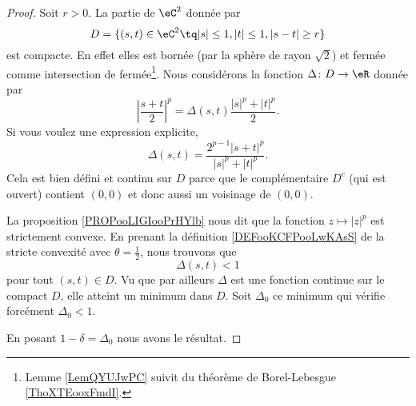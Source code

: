 \begin{proof}
Soit \( r>0\). La partie de \( \eC^2\) donnée par
\begin{equation}
    D=\{ (s,t)\in \eC^2\tq | s |\leq 1, | t |\leq 1,| s-t |\geq r \}
\end{equation}
est compacte. En effet elles est bornée (par la sphère de rayon \( \sqrt{ 2 }\)) et fermée comme intersection de fermée\footnote{Lemme \ref{LemQYUJwPC} suivit du théorème de Borel-Lebesgue \ref{ThoXTEooxFmdI}.}. Nous considérons la fonction \( \Delta\colon D\to \eR\) donnée par
\begin{equation}
    \left| \frac{ s+t }{2} \right|^p=\Delta(s,t)\frac{ | s |^p+| t |^p }{2}.
\end{equation}
Si vous voulez une expression explicite,
\begin{equation}
    \Delta(s,t)=\frac{ 2^{p-1}| s+t |^p }{ | s |^p+| t |^p }.
\end{equation}
Cela est bien défini et continu sur \( D\) parce que le complémentaire \( D^c\) (qui est ouvert) contient \( (0,0)\) et donc aussi un voisinage de \( (0,0)\).

La proposition \ref{PROPooLIGIooPrHYlb} nous dit que la fonction \( z\mapsto | z |^p\) est strictement convexe. En prenant la définition \ref{DEFooKCFPooLwKAsS} de la stricte convexité avec \( \theta=\frac{ 1 }{2}\), nous trouvons que
\begin{equation}
    \Delta(s,t)<1
\end{equation}
pour tout \( (s,t)\in D\). Vu que par ailleurs \( \Delta\) est une fonction continue sur le compact \( D\), elle atteint un minimum dans \( D\). Soit \( \Delta_0\) ce minimum qui vérifie forcément \( \Delta_0<1\).

En posant \( 1-\delta=\Delta_0\) nous avons le résultat.
\end{proof}
